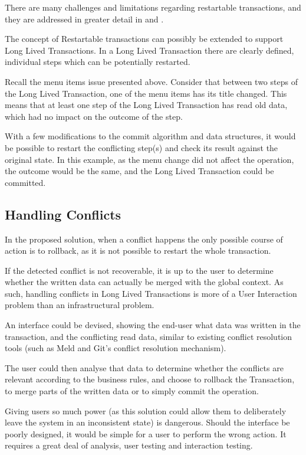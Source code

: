 There are many challenges and limitations regarding restartable
transactions, and they are addressed in greater detail in
\cite{cachopo2006versioned} and \cite{BrunoJorgeGasparFranco2013}.

The concept of Restartable transactions can possibly be extended to
support Long Lived Transactions. In a Long Lived Transaction there are
clearly defined, individual steps which can be potentially restarted.

Recall the menu items issue presented above. Consider that between two
steps of the Long Lived Transaction, one of the menu items has its
title changed. This means that at least one step of the Long Lived
Transaction has read old data, which had no impact on the outcome of
the step.

With a few modifications to the commit algorithm and data structures,
it would be possible to restart the conflicting step(s) and check its
result against the original state. In this example, as the menu change
did not affect the operation, the outcome would be the same, and the
Long Lived Transaction could be committed.

\subsection{Handling Conflicts}

In the proposed solution, when a conflict happens the only possible
course of action is to rollback, as it is not possible to restart the
whole transaction.

If the detected conflict is not recoverable, it is up to the user to
determine whether the written data can actually be merged with the
global context. As such, handling conflicts in Long Lived Transactions
is more of a User Interaction problem than an infrastructural problem.

An interface could be devised, showing the end-user what data was
written in the transaction, and the conflicting read data, similar to
existing conflict resolution tools (such as Meld and Git's conflict
resolution mechanism).

The user could then analyse that data to determine whether the
conflicts are relevant according to the business rules, and choose to
rollback the Transaction, to merge parts of the written data or to
simply commit the operation.

Giving users so much power (as this solution could allow them to
deliberately leave the system in an inconsistent state) is
dangerous. Should the interface be poorly designed, it would be simple
for a user to perform the wrong action. It requires a great deal of
analysis, user testing and interaction testing.

